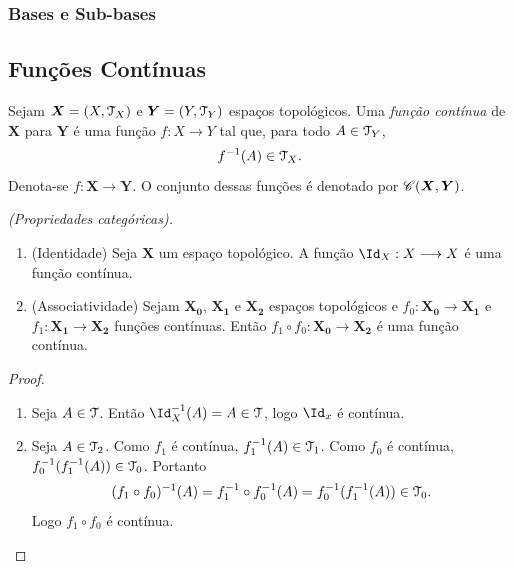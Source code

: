 \subsubsection{Bases e Sub-bases}


\subsection{Funções Contínuas}

\begin{defi}
Sejam $\bm X = (X,\mathcal{T}_X)$ e $\bm Y = (Y,\mathcal{T}_Y)$ espaços topológicos. Uma \emph{função contínua} de $\bm X$ para $\bm Y$ é uma função $f: X \to Y$ tal que, para todo $A \in \mathcal{T}_Y$,
	\begin{equation*}
	f^{-1}(A) \in \mathcal{T}_X.
	\end{equation*}
Denota-se $f: \bm X \to \bm Y$. O conjunto dessas funções é denotado por $\mathscr{C}(\bm X,\bm Y)$.
\end{defi}

\begin{prop}\emph{(Propriedades categóricas).}
\begin{enumerate}
	\item (Identidade) Seja $\bm X$ um espaço topológico. A função $\Id_X: X \to X$ é uma função contínua.
	\item (Associatividade) Sejam $\bm{X_0}$, $\bm{X_1}$ e $\bm{X_2}$ espaços topológicos e $f_0: \bm{X_0} \to \bm{X_1}$ e $f_1: \bm{X_1} \to \bm{X_2}$ funções contínuas. Então $f_1 \circ f_0: \bm{X_0} \to \bm{X_2}$ é uma função contínua.
\begin{figure}
\centering
{}
\end{figure}
	\end{enumerate}
\end{prop}
\begin{proof}
\begin{enumerate}
	\item Seja $A \in \mathcal{T}$. Então $\Id_X\inv(A)=A \in \topo$, logo $\Id_x$ é contínua.
	
	\item Seja $A \in \mathcal{T}_2$. Como $f_1$ é contínua, $f_1^{-1}(A) \in \mathcal{T}_1$. Como $f_0$ é contínua, $f_0^{-1}(f_1^{-1}(A)) \in \mathcal{T}_0$. Portanto
	\begin{equation*}
	(f_1 \circ f_0)^{-1}(A) = f_1^{-1} \circ f_0^{-1} (A) = f_0^{-1}(f_1^{-1}(A)) \in \mathcal{T}_0.
	\end{equation*}
Logo $f_1 \circ f_0$ é contínua.
\end{enumerate}
\end{proof}

